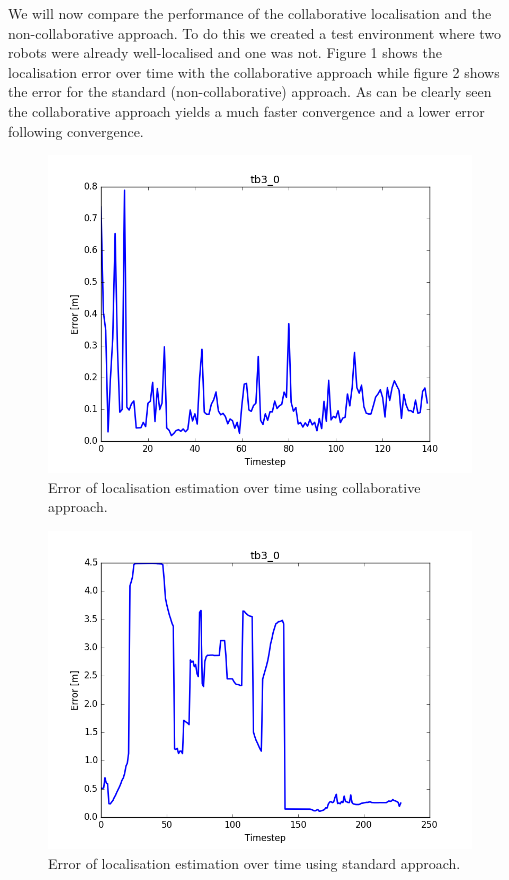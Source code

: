 \documentclass[10pt,a4paper]{article}
\begin{document}
We will now compare the performance of the collaborative localisation and the non-collaborative approach. To do this we created a test environment where two robots were already well-localised and one was not. Figure 1 shows the localisation error over time with the collaborative approach while figure 2 shows the error for the standard (non-collaborative) approach. As can be clearly seen the collaborative approach yields a much faster convergence and a lower error following convergence.
\begin{figure}
	\centering
	\includegraphics[width=\columnwidth]{figure_l1.png}
	\caption{Error of localisation estimation over time using collaborative approach.}
\end{figure}
\begin{figure}
	\includegraphics[width=\columnwidth]{figure_l2.png}
	\caption{Error of localisation estimation over time using standard approach.}
\end{figure}
\end{document}
